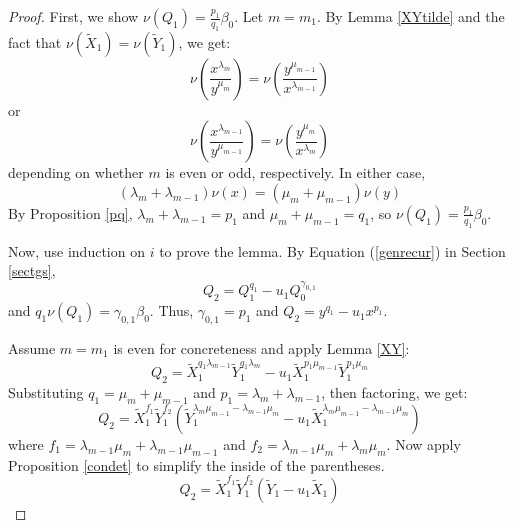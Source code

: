 \documentclass[10pt,a4paper]{amsart}
\begin{document}
\begin{proof}
First, we show $\displaystyle \nu(Q_1)=\frac{p_1}{q_1}\beta_0$. Let $m=m_1$. By Lemma \ref{XYtilde} and the fact that $\nu(\tilde X_1)=\nu(\tilde Y_1)$, we get:
\begin{equation*}
\nu\left(\frac{x^{\lambda_m}}{y^{\mu_m}}\right)=\nu\left(\frac{y^{\mu_{m-1}}}{x^{\lambda_{m-1}}}\right)
\end{equation*}
or
\begin{equation*}
\nu\left(\frac{x^{\lambda_{m-1}}}{y^{\mu_{m-1}}}\right)=\nu\left(\frac{y^{\mu_{m}}}{x^{\lambda_{m}}}\right)
\end{equation*}
depending on whether $m$ is even or odd, respectively. In either case,
\begin{equation*}
\left(\lambda_m+\lambda_{m-1}\right)\nu(x)=\left(\mu_m+\mu_{m-1}\right)\nu(y)
\end{equation*}
By Proposition \ref{pq}, $\lambda_m+\lambda_{m-1}=p_1$ and $\mu_m+\mu_{m-1}=q_1$, so $\displaystyle \nu(Q_1)=\frac{p_1}{q_1}\beta_0$.

Now, use induction on $i$ to prove the lemma. By Equation (\ref{genrecur}) in Section \ref{sectgs},
\begin{equation*}
Q_2=Q_1^{q_1}-u_1Q_0^{\gamma_{0,1}}
\end{equation*}
and $\displaystyle q_1\nu(Q_1) = \gamma_{0,1} \beta_0$. Thus, $\gamma_{0,1}=p_1$ and $\displaystyle Q_2 = y^{q_1} - u_1x^{p_1}$.

Assume $m=m_1$ is even for concreteness and apply Lemma \ref{XY}:
\begin{equation*}
Q_2 = \tilde X_1^{q_1\lambda_{m-1}} \tilde Y_1^{q_1\lambda_{m}} - u_1 \tilde X_1^{p_1\mu_{m-1}} \tilde Y_1^{p_1\mu_{m}}
\end{equation*}
Substituting $q_1 = \mu_m + \mu_{m-1}$ and $p_1=\lambda_m + \lambda_{m-1}$, then factoring, we get:
\begin{equation*}
Q_2 = \tilde X_1^{f_1} \tilde Y_1^{f_2}\left(\tilde Y_1^{\lambda_m\mu_{m-1}-\lambda_{m-1}\mu_m} -u_1 \tilde X_1^{\lambda_m\mu_{m-1}-\lambda_{m-1}\mu_m} \right)
\end{equation*}
where $f_1=\lambda_{m-1}\mu_m+\lambda_{m-1}\mu_{m-1}$ and $f_2=\lambda_{m-1}\mu_m+\lambda_m\mu_m$.
Now apply Proposition \ref{condet} to simplify the inside of the parentheses.
\begin{equation*}
Q_2 = \tilde X_1^{f_1} \tilde Y_1^{f_2}\left(\tilde Y_1 -u_1 \tilde X_1 \right)
\end{equation*}


\end{proof}
\end{document}
